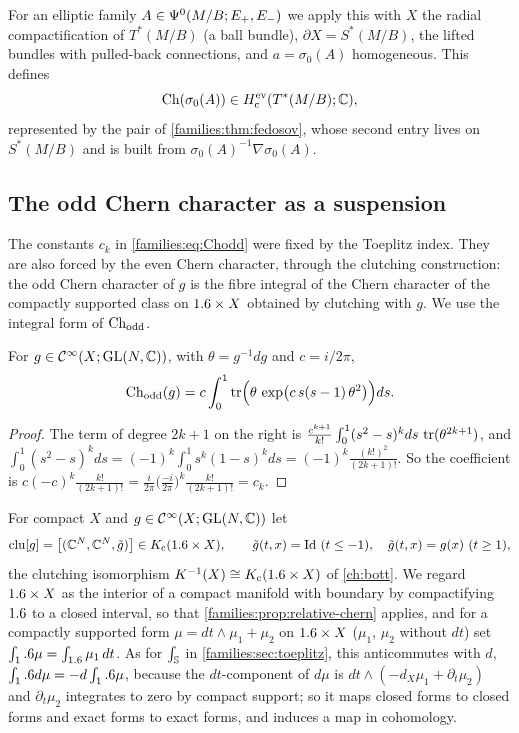 For an elliptic family $A\in\Psi^{0}(M/B;E_+,E_-)$ we apply this with $X$ the
radial compactification of $T^*(M/B)$ (a ball bundle), $\partial X=S^*(M/B)$,
the lifted bundles with pulled-back connections, and $a=\sigma_0(A)$
homogeneous. This defines
\begin{equation*}
  \operatorname{Ch}(\sigma_0(A))\in H^{\mathrm{ev}}_{\mathrm c}(T^*(M/B);\mathbb{C}),
\end{equation*}
represented by the pair of \cref{families:thm:fedosov}, whose second entry
lives on $S^*(M/B)$ and is built from $\sigma_0(A)^{-1}\nabla\sigma_0(A)$.

\subsection{The odd Chern character as a suspension}
The constants $c_k$ in \eqref{families:eq:Chodd} were fixed by the Toeplitz index. They are
also forced by the even Chern character, through the clutching construction: the odd
Chern character of $g$ is the fibre integral of the Chern character of the compactly
supported class on $1.6\times X$ obtained by clutching with $g$. We use the
integral form of $\operatorname{Ch}_{\mathrm{odd}}$.

\begin{lemma}\label{families:lem:Chodd-integral}
  For $g\in\mathcal{C}^\infty(X;\operatorname{GL}(N,\mathbb{C}))$, with $\theta=g^{-1}dg$ and $c=i/2\pi$,
  \begin{equation*}
    \operatorname{Ch}_{\mathrm{odd}}(g)=c\int_0^1\operatorname{tr}\Bigl(\theta\,\exp\bigl(c\,s(s-1)\,\theta^2\bigr)\Bigr)ds .
  \end{equation*}
\end{lemma}
\begin{proof}
  The term of degree $2k+1$ on the right is
  $\frac{c^{k+1}}{k!}\int_0^1(s^2-s)^kds\,\operatorname{tr}(\theta^{2k+1})$, and
  $\int_0^1(s^2-s)^kds=(-1)^k\int_0^1s^k(1-s)^kds=(-1)^k\frac{(k!)^2}{(2k+1)!}$. So the
  coefficient is $c(-c)^k\frac{k!}{(2k+1)!}=\frac{i}{2\pi}\bigl(\frac{-i}{2\pi}\bigr)^k\frac{k!}{(2k+1)!}=c_k$.
\end{proof}

For compact $X$ and $g\in\mathcal{C}^\infty(X;\operatorname{GL}(N,\mathbb{C}))$ let
\begin{equation*}
  \operatorname{clu}[g]=\bigl[(\mathbb{C}^N,\mathbb{C}^N,\tilde g)\bigr]\in K_{\mathrm{c}}(1.6\times X),\qquad
  \tilde g(t,x)=\operatorname{Id}\ (t\le-1),\quad\tilde g(t,x)=g(x)\ (t\ge1),
\end{equation*}
the clutching isomorphism $K^{-1}(X)\cong K_{\mathrm{c}}(1.6\times X)$ of \cref{ch:bott}. We regard
$1.6\times X$ as the interior of a compact manifold with boundary by compactifying $1.6$ to
a closed interval, so that \cref{families:prop:relative-chern} applies, and for a
compactly supported form $\mu=dt\wedge\mu_1+\mu_2$ on $1.6\times X$ ($\mu_1$, $\mu_2$
without $dt$) set $\int_1.6\mu=\int_{1.6}\mu_1\,dt$. As for $\int_{\mathbb{S}}$ in
\cref{families:sec:toeplitz}, this anticommutes with $d$, $\int_1.6 d\mu=-d\int_1.6\mu$,
because the $dt$-component of $d\mu$ is $dt\wedge(-d_X\mu_1+\partial_t\mu_2)$ and
$\partial_t\mu_2$ integrates to zero by compact support; so it maps closed forms to
closed forms and exact forms to exact forms, and induces a map in cohomology.

